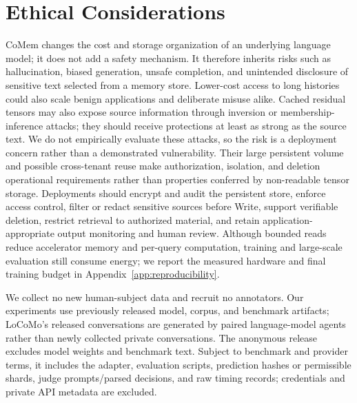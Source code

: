 \section{Ethical Considerations}
\label{sec:ethics}
CoMem changes the cost and storage organization of an underlying language model;
it does not add a safety mechanism. It therefore inherits risks such as
hallucination, biased generation, unsafe completion, and unintended disclosure
of sensitive text selected from a memory store. Lower-cost access to long
histories could also scale benign applications and deliberate misuse alike.
Cached residual tensors may also expose source information through inversion or
membership-inference attacks; they should receive protections at least as strong
as the source text. We do not empirically evaluate these attacks, so the risk is
a deployment concern rather than a demonstrated vulnerability. Their large persistent volume and possible cross-tenant reuse
make authorization, isolation, and deletion operational requirements rather than
properties conferred by non-readable tensor storage. Deployments should encrypt and audit the persistent store,
enforce access control, filter or redact sensitive sources before Write, support
verifiable deletion, restrict retrieval to authorized material, and retain
application-appropriate output monitoring and human review. Although bounded reads reduce accelerator memory
and per-query computation, training and large-scale evaluation still consume
energy; we report the measured hardware and final training budget in
Appendix~\ref{app:reproducibility}.

We collect no new human-subject data and recruit no annotators. Our experiments
use previously released model, corpus, and benchmark artifacts; LoCoMo's released
conversations are generated by paired language-model agents rather than newly
collected private conversations. The anonymous release excludes model weights
and benchmark text. Subject to benchmark and provider terms, it includes the
adapter, evaluation scripts, prediction hashes or permissible shards, judge
prompts/parsed decisions, and raw timing records; credentials and private API
metadata are excluded.
